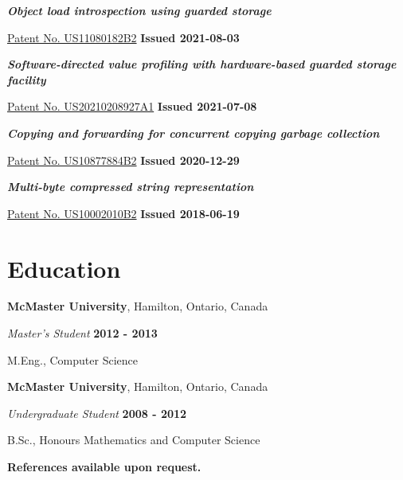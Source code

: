 \documentclass[margin,line]{res}
\begin{document}
\begin{resume}
\begin{list}{}{\leftmargin=0cm}

\item {\em \bf Object load introspection using guarded storage}

\href{https://patents.google.com/patent/US11080182B2}{Patent No. US11080182B2} \hfill {\bf Issued 2021-08-03}

\item {\em \bf Software-directed value profiling with hardware-based guarded storage facility}

\href{https://patents.google.com/patent/US20210208927A1}{Patent No. US20210208927A1} \hfill {\bf Issued 2021-07-08}

\item {\em \bf Copying and forwarding for concurrent copying garbage collection}

\href{https://patents.google.com/patent/US10877884B2}{Patent No. US10877884B2} \hfill {\bf Issued 2020-12-29}

\item {\em \bf Multi-byte compressed string representation}

\href{https://patents.google.com/patent/US10002010B2}{Patent No. US10002010B2} \hfill {\bf Issued 2018-06-19}

\end{list}

\section{\sc Education}

{\bf McMaster University}, Hamilton, Ontario, Canada

\vspace{-.3cm}

{\em Master's Student} \hfill {\bf 2012 - 2013}

\vspace{-.4cm}

M.Eng., Computer Science

{\bf McMaster University}, Hamilton, Ontario, Canada

\vspace{-.3cm}

{\em Undergraduate Student} \hfill {\bf 2008 - 2012}

\vspace{-.4cm}

B.Sc., Honours Mathematics and Computer Science

\begin{center}
\textbf{References available upon request.}
\end{center}

\end{resume}
\end{document}
